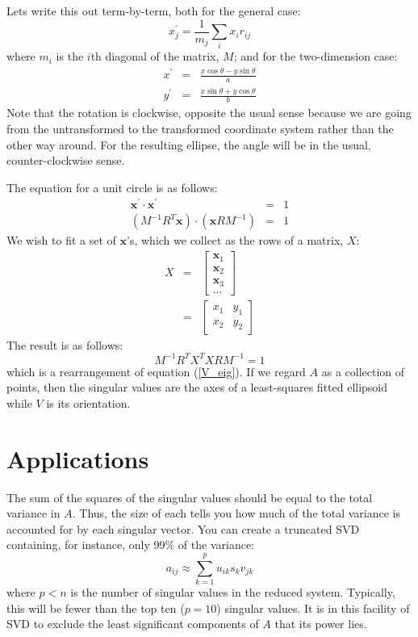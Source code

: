 \documentclass{article}
\renewcommand{\vec}[1]{\boldsymbol{#1}}
\begin{document}
Lets write this out term-by-term, both for the general case:
\begin{equation}
	x_j^\prime = \frac{1}{m_j} \sum_i x_i r_{ij}
\end{equation}
where $m_i$ is the $i$th diagonal of the matrix, $M$;
and for the two-dimension case:
\begin{eqnarray}
	x^\prime & = & \frac{x \cos \theta - y \sin \theta}{a} \\
	y^\prime & = & \frac{x \sin \theta + y \cos \theta}{b}
\end{eqnarray}
Note that the rotation is clockwise, opposite the usual sense because we are
going from the untransformed to the transformed coordinate system rather than
the other way around. 
For the resulting ellipse, the angle will be in the usual, 
counter-clockwise sense.

The equation for a unit circle is as follows:
\begin{eqnarray}
	\vec x^\prime \cdot \vec x^\prime & = & 1 \\
	\left ( M^{-1} R^T \vec x \right ) \cdot \left ( \vec x R M^{-1} \right ) & = & 1
\end{eqnarray}
We wish to fit a set of $\vec x$'s, which we collect as the rows of a
matrix, $X$:
\begin{eqnarray}
	X & = & \left [
	\begin{array}{l}
		\vec x_1 \\
		\vec x_2 \\
		\vec x_3 \\
		...
\end{array} \right ] \\
& = & \left [ \begin{array}{ll}
x_1 & y_1 \\
x_2 & y_2 \end{array}
\right ]
\end{eqnarray}
The result is as follows:
\begin{equation}
M^{-1} R^T X^T X R M^{-1} = 1
\end{equation}
which is a rearrangement of equation (\ref{V_eig}).
If we regard $A$ as a collection of points, 
then the singular values are the axes of a least-squares fitted ellipsoid
while $V$ is its orientation.


\section{Applications}

The sum of the squares of the singular values should be equal to the total
variance in $A$.
Thus, the size of each tells you how much of the total 
variance is accounted for by each singular vector.
You can create a truncated SVD containing, for instance, only 99\% of the
variance:
\begin{equation}
a_{ij} \approx \sum_{k=1}^p u_{ik} s_k v_{jk}
\label{truncated_SVD}
\end{equation}
where $p<n$ is the number of singular values in the reduced system.
Typically, this will be fewer than the top ten ($p=10$) singular values.
It is in this facility of SVD to exclude the least significant components of
$A$ that its power lies.
\end{document}
